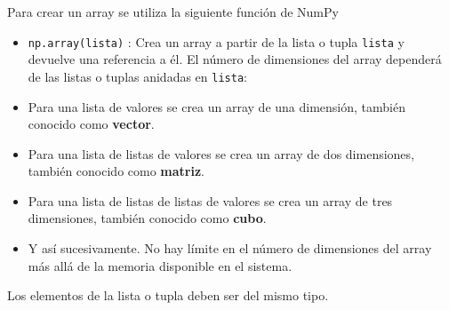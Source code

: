 \documentclass[
  spanish,
  a4paper,
]{scrreport}
\begin{document}
Para crear un array se utiliza la siguiente función de NumPy

\begin{itemize}
\item
  \texttt{np.array(lista)} : Crea un array a partir de la lista o tupla
  \texttt{lista} y devuelve una referencia a él. El número de
  dimensiones del array dependerá de las listas o tuplas anidadas en
  \texttt{lista}:
\item
  Para una lista de valores se crea un array de una dimensión, también
  conocido como \textbf{vector}.
\item
  Para una lista de listas de valores se crea un array de dos
  dimensiones, también conocido como \textbf{matriz}.
\item
  Para una lista de listas de listas de valores se crea un array de tres
  dimensiones, también conocido como \textbf{cubo}.
\item
  Y así sucesivamente. No hay límite en el número de dimensiones del
  array más allá de la memoria disponible en el sistema.
\end{itemize}

\begin{tcolorbox}[enhanced jigsaw, arc=.35mm, bottomrule=.15mm, bottomtitle=1mm, breakable, colback=white, colbacktitle=quarto-callout-warning-color!10!white, colframe=quarto-callout-warning-color-frame, coltitle=black, left=2mm, leftrule=.75mm, opacityback=0, opacitybacktitle=0.6, rightrule=.15mm, title=\textcolor{quarto-callout-warning-color}{\faExclamationTriangle}\hspace{0.5em}{Advertencia}, titlerule=0mm, toprule=.15mm, toptitle=1mm]

Los elementos de la lista o tupla deben ser del mismo tipo.

\end{tcolorbox}
\end{document}
